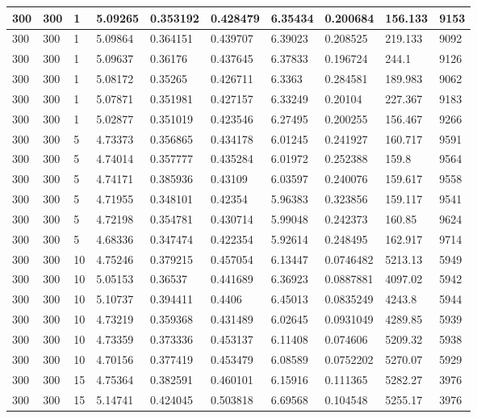 \begin{landscape}
\begin{longtable}{ | l | l | l | l | l | l | l | l | l | l | }
300 & 300 & 1 & 5.09265 & 0.353192 & 0.428479 & 6.35434 & 0.200684 & 156.133 & 9153\\ \hline
300 & 300 & 1 & 5.09864 & 0.364151 & 0.439707 & 6.39023 & 0.208525 & 219.133 & 9092\\ \hline
300 & 300 & 1 & 5.09637 & 0.36176 & 0.437645 & 6.37833 & 0.196724 & 244.1 & 9126\\ \hline
300 & 300 & 1 & 5.08172 & 0.35265 & 0.426711 & 6.3363 & 0.284581 & 189.983 & 9062\\ \hline
300 & 300 & 1 & 5.07871 & 0.351981 & 0.427157 & 6.33249 & 0.20104 & 227.367 & 9183\\ \hline
300 & 300 & 1 & 5.02877 & 0.351019 & 0.423546 & 6.27495 & 0.200255 & 156.467 & 9266\\ \hline
300 & 300 & 5 & 4.73373 & 0.356865 & 0.434178 & 6.01245 & 0.241927 & 160.717 & 9591\\ \hline
300 & 300 & 5 & 4.74014 & 0.357777 & 0.435284 & 6.01972 & 0.252388 & 159.8 & 9564\\ \hline
300 & 300 & 5 & 4.74171 & 0.385936 & 0.43109 & 6.03597 & 0.240076 & 159.617 & 9558\\ \hline
300 & 300 & 5 & 4.71955 & 0.348101 & 0.42354 & 5.96383 & 0.323856 & 159.117 & 9541\\ \hline
300 & 300 & 5 & 4.72198 & 0.354781 & 0.430714 & 5.99048 & 0.242373 & 160.85 & 9624\\ \hline
300 & 300 & 5 & 4.68336 & 0.347474 & 0.422354 & 5.92614 & 0.248495 & 162.917 & 9714\\ \hline
300 & 300 & 10 & 4.75246 & 0.379215 & 0.457054 & 6.13447 & 0.0746482 & 5213.13 & 5949\\ \hline
300 & 300 & 10 & 5.05153 & 0.36537 & 0.441689 & 6.36923 & 0.0887881 & 4097.02 & 5942\\ \hline
300 & 300 & 10 & 5.10737 & 0.394411 & 0.4406 & 6.45013 & 0.0835249 & 4243.8 & 5944\\ \hline
300 & 300 & 10 & 4.73219 & 0.359368 & 0.431489 & 6.02645 & 0.0931049 & 4289.85 & 5939\\ \hline
300 & 300 & 10 & 4.73359 & 0.373336 & 0.453137 & 6.11408 & 0.074606 & 5209.32 & 5938\\ \hline
300 & 300 & 10 & 4.70156 & 0.377419 & 0.453479 & 6.08589 & 0.0752202 & 5270.07 & 5929\\ \hline
300 & 300 & 15 & 4.75364 & 0.382591 & 0.460101 & 6.15916 & 0.111365 & 5282.27 & 3976\\ \hline
300 & 300 & 15 & 5.14741 & 0.424045 & 0.503818 & 6.69568 & 0.104548 & 5255.17 & 3976\\ \hline

\end{longtable}
\end{landscape}
